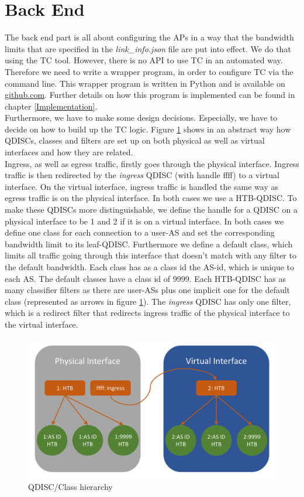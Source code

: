 \section{Back End}

The back end part is all about configuring the \acsp{AP} in a way that the bandwidth limits that are specified in the \textit{link\_info.json} file are put into effect. We do that using the \acs{TC} tool. However, there is no \acs{API} to use \acs{TC} in an automated way. Therefore we need to write a wrapper program, in order to configure \acs{TC} via the command line. This wrapper program is written in Python and is available on \href{https://github.com/ManuelMeinen/SCIONLab_Bandwidth_Limiter}{github.com}. Further details on how this program is implemented can be found in chapter \ref{Implementation}.
\\
Furthermore, we have to make some design decisions. Especially, we have to decide on how to build up the \acs{TC} logic. Figure \ref{QDISC-Set-up} shows in an abstract way how \acsp{QDISC}, classes and filters are set up on both physical as well as virtual interfaces and how they are related.
\\
Ingress, as well as egress traffic, firstly goes through the physical interface. Ingress traffic is then redirected by the \textit{ingress} \acs{QDISC} (with handle ffff) to a virtual interface. On the virtual interface, ingress traffic is handled the same way as egress traffic is on the physical interface. In both cases we use a \acs{HTB}-\acs{QDISC}. To make these \acsp{QDISC} more distinguishable, we define the handle for a \acs{QDISC} on a physical interface to be 1 and 2 if it is on a virtual interface. In both cases we define one class for each connection to a user-\acs{AS} and set the corresponding bandwidth limit to its leaf-\acs{QDISC}. Furthermore we define a default class, which limits all traffic going through this interface that doesn't match with any filter to the default bandwidth. Each class has as a class id the \acs{AS}-id, which is unique to each \acs{AS}. The default classes have a class id of 9999. Each \acs{HTB}-\acs{QDISC} has as many classifier filters as there are user-\acsp{AS} plus one implicit one for the default class (represented as arrows in figure \ref{QDISC-Set-up}). The \textit{ingress} \acs{QDISC} has only one filter, which is a redirect filter that redirects ingress traffic of the physical interface to the virtual interface.
\begin{figure}[h]
	\centering
	\includegraphics[width=\textwidth]{img/QDISC-Set-up.png}
	\caption{QDISC/Class hierarchy}
	\label{QDISC-Set-up}
\end{figure}